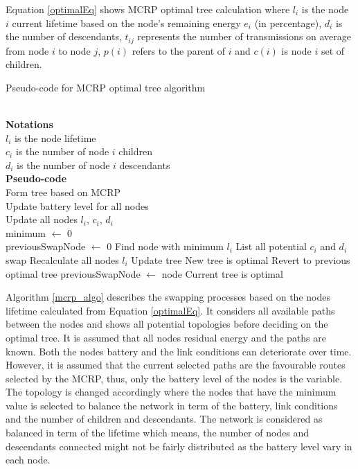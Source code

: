 Equation \ref{optimalEq} shows MCRP optimal tree calculation where $l_i$ is the node $i$ current lifetime based on the node's remaining energy $e_i$ (in percentage), $d_i$ is the number of descendants, $t_{ij}$ represents the number of transmissions on average from node $i$ to node $j$, $p(i)$ refers to the parent of $i$ and $c(i)$ is node $i$ set of children.

\begin{algorithm}
\caption{Pseudo-code for MCRP optimal tree algorithm}
\label{mcrp_algo}
\begin{algorithmic}[]
\\\textbf{Notations}
\\$l_i$ is the node lifetime
\\$c_i$ is the number of node $i$ children
\\$d_i$ is the number of node $i$ descendants
\\\textbf{Pseudo-code}
\\Form tree based on MCRP
\\Update battery level for all nodes
\\Update all nodes $l_i$, $c_i$, $d_i$
\\minimum $\leftarrow$ 0
\\previousSwapNode $\leftarrow$ 0 
    \State Find node with minimum $l_i$
    \State List all potential $c_i$ and $d_i$ swap
		\State Recalculate all nodes $l_i$
			\State Update tree
			\State New tree is optimal
		\Else
			\State Revert to previous optimal tree
		\EndIf
			\State previousSwapNode $\leftarrow$ node
	\Else
		\State Current tree is optimal
	\EndIf
  \EndWhile
\end{algorithmic}
\end{algorithm}

Algorithm \ref{mcrp_algo} describes the swapping processes based on the nodes lifetime calculated from Equation \ref{optimalEq}. It considers all available paths between the nodes and shows all potential topologies before deciding on the optimal tree.
It is assumed that all nodes residual energy and the paths are known. Both the nodes battery and the link conditions can deteriorate over time. However, it is assumed that the current selected paths are the favourable routes selected by the MCRP, thus, only the battery level of the nodes is the variable. The topology is changed accordingly where the nodes that have the minimum value is selected to balance the network in term of the battery, link conditions and the number of children and descendants. The network is considered as balanced in term of the lifetime which means, the number of nodes and descendants connected might not be fairly distributed as the battery level vary in each node.

